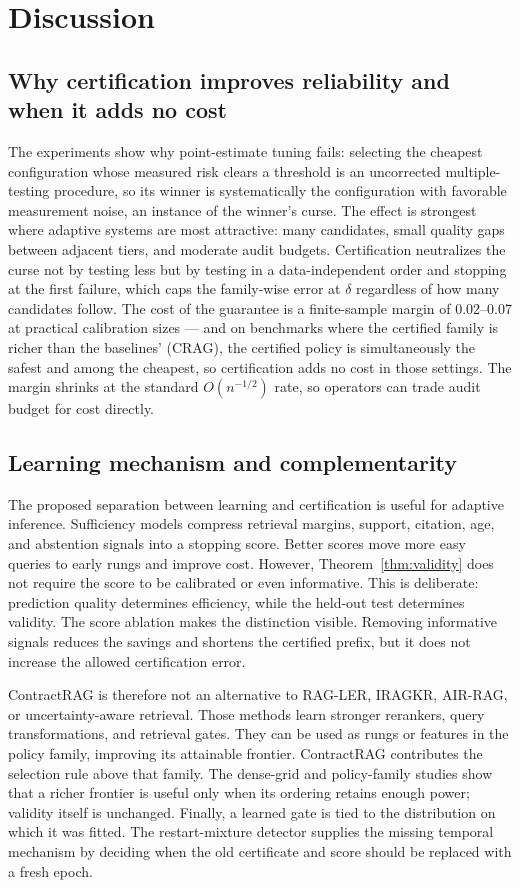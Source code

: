 \section{Discussion}
\label{sec:discussion}

\subsection{Why certification improves reliability and when it adds no cost}
The experiments show why point-estimate tuning fails:
selecting the cheapest configuration whose measured risk clears a
threshold is an uncorrected multiple-testing procedure, so its winner
is systematically the configuration with favorable measurement noise,
an instance of the winner's curse. The effect is strongest where adaptive
systems are most attractive: many candidates, small quality gaps
between adjacent tiers, and moderate audit budgets. Certification
neutralizes the curse not by testing less but by testing in a
data-independent order and stopping at the first failure, which caps
the family-wise error at $\delta$ regardless of how many candidates
follow. The cost of the guarantee is a finite-sample margin of
0.02--0.07 at practical calibration sizes --- and on benchmarks where
the certified family is richer than the baselines' (CRAG), the
certified policy is simultaneously the safest and among the cheapest,
so certification adds no cost in those settings. The margin shrinks at the standard
$O(n^{-1/2})$ rate, so operators can trade audit budget for cost
directly.

\subsection{Learning mechanism and complementarity}
The proposed separation between learning and certification is useful
for adaptive inference. Sufficiency models compress retrieval margins,
support, citation, age, and abstention signals into a stopping score.
Better scores move more easy queries to early rungs and improve cost.
However, Theorem~\ref{thm:validity} does not require the score to be
calibrated or even informative. This is deliberate: prediction quality
determines efficiency, while the held-out test determines validity.
The score ablation makes the distinction visible. Removing informative
signals reduces the savings and shortens the certified prefix, but it
does not increase the allowed certification error.

ContractRAG is therefore not an alternative to RAG-LER, IRAGKR,
AIR-RAG, or uncertainty-aware retrieval. Those methods learn stronger
rerankers, query transformations, and retrieval gates. They can be used
as rungs or features in the policy family, improving its attainable
frontier. ContractRAG contributes the selection rule above that family.
The dense-grid and policy-family studies show that a richer frontier is
useful only when its ordering retains enough power; validity itself is
unchanged. Finally, a learned gate is tied to the distribution on which
it was fitted. The restart-mixture detector supplies the missing
temporal mechanism by deciding when the old certificate and score
should be replaced with a fresh epoch.

